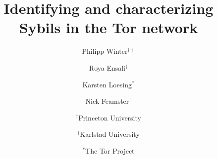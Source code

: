 \documentclass[letterpaper,twocolumn,10pt]{article}
\begin{document}
\date{}

\title{\Large \bf Identifying and characterizing Sybils in the Tor network}

\author{
{\rm Philipp Winter$^{\dagger\ddagger}$} \\
\and
{\rm Roya Ensafi$^{\dagger}$} \\
\and
{\rm Karsten Loesing$^{*}$} \\
\and
{\rm Nick Feamster$^{\dagger}$} \\
\and
$^{\dagger}$Princeton University \\
\and
$^{\ddagger}$Karlstad University \\
\and
$^{*}$The Tor Project
}

\maketitle

\thispagestyle{empty}



















\printbibliography


\end{document}
